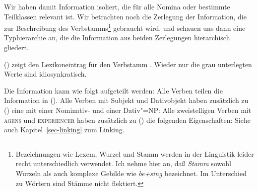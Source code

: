 Wir haben damit Information isoliert, die für alle Nomina oder bestimmte Teilklassen
relevant ist. Wir betrachten noch die Zerlegung der Information, die zur Beschreibung
des Verbstamms\footnote{
  Bezeichnungen wie Lexem, Wurzel und Stamm 
  werden in der Linguistik leider recht unterschiedlich verwendet. 
  Ich nehme hier an, daß \emph{Stamm} sowohl Wurzeln als auch komplexe Gebilde wie
  \emph{be+sing} bezeichnet. Im Unterschied zu Wörtern sind Stämme nicht flektiert.%
}
 gebraucht wird, und schauen uns dann eine Typhierarchie an,
die die Information aus beiden Zerlegungen hierarchisch gliedert.

() zeigt den Lexikoneintrag für den Verbstamm . Wieder nur die
grau unterlegten Werte sind idiosynkratisch.
\ea
{}
\z

\noindent
Die Information kann wie folgt aufgeteilt werden: Alle Verben teilen die Information
in ().
\ea
{}
\z
Alle Verben mit Subjekt und Dativobjekt  haben zusätzlich zu () eine \subcatl
mit einer Nominativ- und einer Dativ"=NP:
\ea
{}
\z
Alle zweistelligen Verben mit \textsc{agens} und \textsc{experiencer} haben zusätzlich
zu () die folgenden Eigenschaften:
\ea
\label{bsp-linking-agens-experiencer}
\z
Siehe auch Kapitel~\ref{sec-linking} zum Linking.

